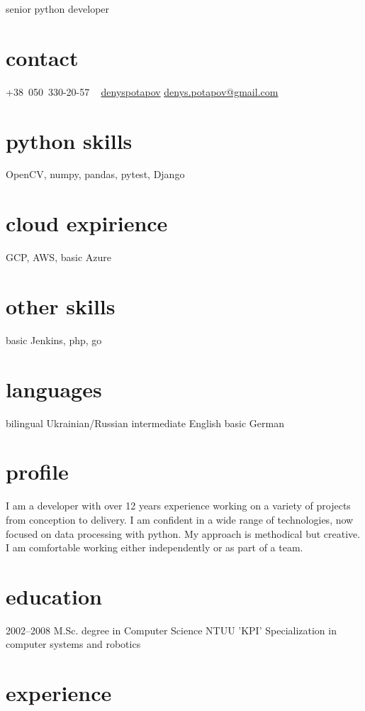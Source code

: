 \documentclass[hidelinks,a4paper]{cv}
\begin{document}
       {senior python developer}


\begin{aside}
  \section{contact}
     +38~050~330-20-57
     \faLinkedin~ \href{https://www.linkedin.com/in/denyspotapov}{denyspotapov}
     \href{mailto:denys.potapov@gmail.com}{denys.potapov@gmail.com}
  \section{python skills}
    OpenCV, numpy, pandas,
    pytest, Django
  \section{cloud expirience}
    GCP, AWS, basic Azure
  \section{other skills}
    basic Jenkins, php, go
  \section{languages}
    bilingual Ukrainian/Russian
    intermediate English
    basic German
\end{aside}

\section{profile}
I am a developer with over 12 years experience working on a variety of projects from conception to delivery. I am confident in a wide range of technologies, now focused on data processing with python. My approach is methodical but creative. I am comfortable working either independently or as part of a team.
\section{education}

\begin{entrylist}
  \entry
    {2002–2008}
    {M.Sc. degree in Computer Science}
    {NTUU 'KPI'}
    {Specialization in computer systems and robotics}
\end{entrylist}

\section{experience}
\end{document}
